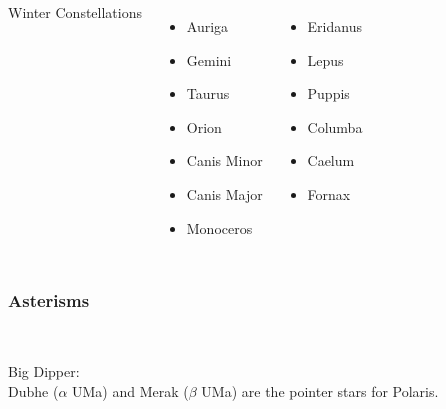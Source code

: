 \begin{frame}{\insertsubsubsectionhead}
  \begin{columns}[T,onlytextwidth]

    \centering

    {\Large Winter Constellations}
    \begin{columns}[T,onlytextwidth]
      \begin{itemize}
        \item Auriga
        \item Gemini
        \item Taurus
        \item Orion
        \item Canis Minor
        \item Canis Major
        \item Monoceros
      \end{itemize}
      \begin{itemize}
        \item Eridanus
        \item Lepus
        \item Puppis
        \item Columba
        \item Caelum
        \item Fornax
      \end{itemize}
    \end{columns}
  \end{columns}
\end{frame}

\subsubsection{Asterisms}

\begin{frame}{\insertsubsubsectionhead}
  \begin{columns}[T,onlytextwidth]

    \centering

    \ \\
    \Large Big Dipper: \\[1ex]

    Dubhe ($\alpha$ UMa) and Merak ($\beta$ UMa) are the pointer stars for Polaris.
    
    
  \end{columns}
\end{frame}

